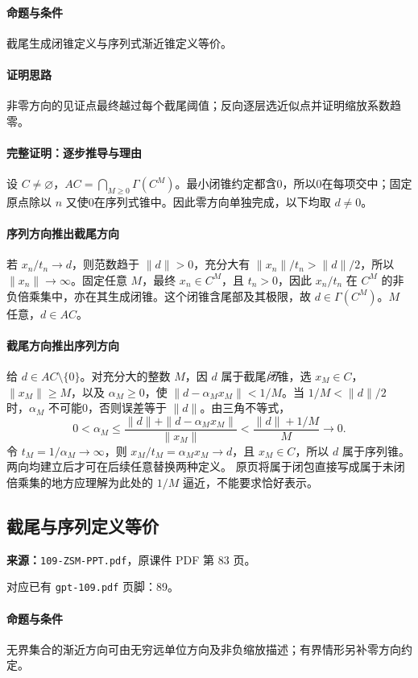 \paragraph{命题与条件}截尾生成闭锥定义与序列式渐近锥定义等价。
\paragraph{证明思路}非零方向的见证点最终越过每个截尾阈值；反向逐层选近似点并证明缩放系数趋零。
\paragraph{完整证明：逐步推导与理由}

设 $C\ne\varnothing$，$AC=\bigcap_{M\ge0}\Gamma(C^M)$。最小闭锥约定都含0，所以0在每项交中；固定原点除以 $n$ 又使0在序列式锥中。因此零方向单独完成，以下均取 $d\ne0$。
\paragraph{序列方向推出截尾方向}
若 $x_n/t_n\to d$，则范数趋于 $\|d\|>0$，充分大有 $\|x_n\|/t_n>\|d\|/2$，所以 $\|x_n\|\to\infty$。固定任意 $M$，最终 $x_n\in C^M$，且 $t_n>0$，因此 $x_n/t_n$ 在 $C^M$ 的非负倍乘集中，亦在其生成闭锥。这个闭锥含尾部及其极限，故 $d\in\Gamma(C^M)$。$M$ 任意，$d\in AC$。
\paragraph{截尾方向推出序列方向}
给 $d\in AC\setminus\{0\}$。对充分大的整数 $M$，因 $d$ 属于截尾\emph{闭}锥，选 $x_M\in C$，$\|x_M\|\ge M$，以及 $\alpha_M\ge0$，使 $\|d-\alpha_Mx_M\|<1/M$。当 $1/M<\|d\|/2$ 时，$\alpha_M$ 不可能0，否则误差等于 $\|d\|$。由三角不等式，
\[0<\alpha_M\le\frac{\|d\|+\|d-\alpha_Mx_M\|}{\|x_M\|}<\frac{\|d\|+1/M}{M}\to0.\]
令 $t_M=1/\alpha_M\to\infty$，则 $x_M/t_M=\alpha_Mx_M\to d$，且 $x_M\in C$，所以 $d$ 属于序列锥。两向均建立后才可在后续任意替换两种定义。
原页将属于闭包直接写成属于未闭倍乘集的地方应理解为此处的 $1/M$ 逼近，不能要求恰好表示。

\clearpage\subsection{截尾与序列定义等价}
\textbf{来源：}\texttt{109-ZSM-PPT.pdf}，原课件 PDF 第 83 页。\par
对应已有 \texttt{gpt-109.pdf} 页脚：89。\par
\paragraph{命题与条件}无界集合的渐近方向可由无穷远单位方向及非负缩放描述；有界情形另补零方向约定。
